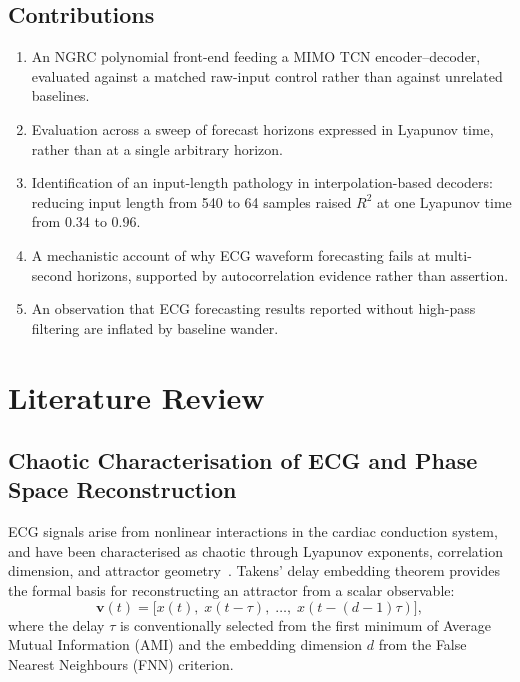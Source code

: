 \documentclass[11pt,a4paper]{article}
\begin{document}
\subsection{Contributions}

\begin{enumerate}[leftmargin=*]
  \item An NGRC polynomial front-end feeding a MIMO TCN encoder--decoder, evaluated against a matched raw-input control rather than against unrelated baselines.
  \item Evaluation across a sweep of forecast horizons expressed in Lyapunov time, rather than at a single arbitrary horizon.
  \item Identification of an input-length pathology in interpolation-based decoders: reducing input length from 540 to 64 samples raised $R^2$ at one Lyapunov time from 0.34 to 0.96.
  \item A mechanistic account of why ECG waveform forecasting fails at multi-second horizons, supported by autocorrelation evidence rather than assertion.
  \item An observation that ECG forecasting results reported without high-pass filtering are inflated by baseline wander.
\end{enumerate}


\section{Literature Review}

\subsection{Chaotic Characterisation of ECG and Phase Space Reconstruction}

ECG signals arise from nonlinear interactions in the cardiac conduction system, and have been characterised as chaotic through Lyapunov exponents, correlation dimension, and attractor geometry~\cite{ramadevi2022}.
Takens' delay embedding theorem provides the formal basis for reconstructing an attractor from a scalar observable:
\begin{equation}
  \mathbf{v}(t) = \bigl[x(t),\; x(t-\tau),\; \ldots,\; x(t-(d-1)\tau)\bigr],
\end{equation}
where the delay $\tau$ is conventionally selected from the first minimum of Average Mutual Information (AMI) and the embedding dimension $d$ from the False Nearest Neighbours (FNN) criterion.
\end{document}
